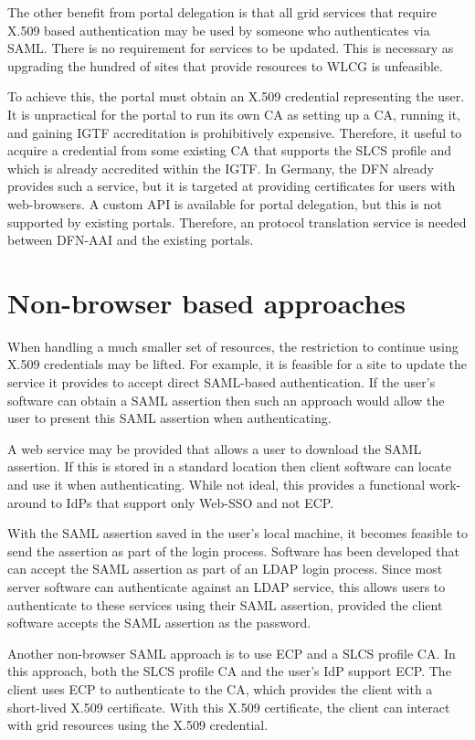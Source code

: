 \documentclass[a4paper]{jpconf}
\begin{document}
The other benefit from portal delegation is that all grid services
that require X.509 based authentication may be used by someone who
authenticates via SAML.  There is no requirement for services to be
updated.  This is necessary as upgrading the hundred of sites that
provide resources to WLCG is unfeasible.

To achieve this, the portal must obtain an X.509 credential
representing the user.  It is unpractical for the portal to run its
own CA as setting up a CA, running it, and gaining IGTF accreditation
is prohibitively expensive.  Therefore, it useful to acquire a
credential from some existing CA that supports the SLCS profile and
which is already accredited within the IGTF.  In Germany, the DFN
already provides such a service, but it is targeted at providing
certificates for users with web-browsers.  A custom API is available
for portal delegation, but this is not supported by existing portals.
Therefore, an protocol translation service is needed between DFN-AAI
and the existing portals.

\section{Non-browser based approaches}

When handling a much smaller set of resources, the restriction to
continue using X.509 credentials may be lifted.  For example, it is
feasible for a site to update the service it provides to accept direct
SAML-based authentication.  If the user's software can obtain a SAML
assertion then such an approach would allow the user to present this
SAML assertion when authenticating.

A web service may be provided that allows a user to download the SAML
assertion.  If this is stored in a standard location then client
software can locate and use it when authenticating.  While not ideal,
this provides a functional work-around to IdPs that support only
Web-SSO and not ECP.

With the SAML assertion saved in the user's local machine, it becomes
feasible to send the assertion as part of the login process.  Software
has been developed that can accept the SAML assertion as part of an
LDAP login process.  Since most server software can authenticate
against an LDAP service, this allows users to authenticate to these
services using their SAML assertion, provided the client software
accepts the SAML assertion as the password.

Another non-browser SAML approach is to use ECP and a SLCS profile CA.
In this approach, both the SLCS profile CA and the user's IdP support
ECP.  The client uses ECP to authenticate to the CA, which provides
the client with a short-lived X.509 certificate.  With this X.509
certificate, the client can interact with grid resources using the
X.509 credential.
\end{document}

